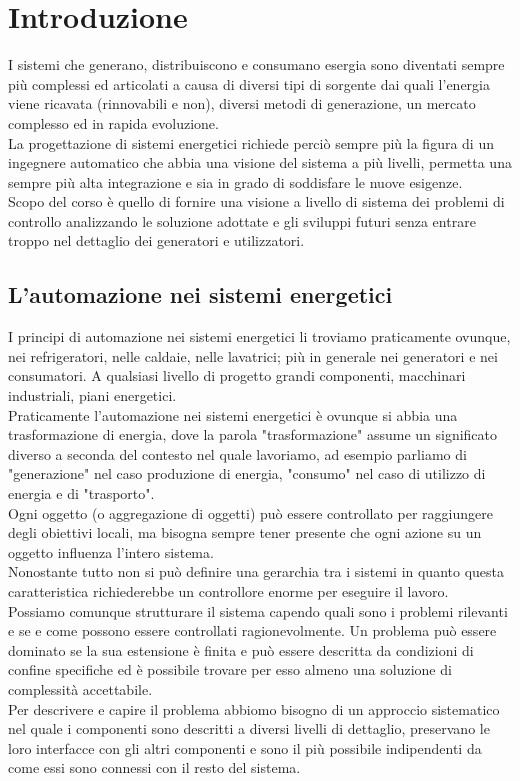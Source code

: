 ﻿\label{capitolo1}
\section{Introduzione}I sistemi che generano, distribuiscono e consumano esergia sono diventati sempre più complessi ed articolati a causa di diversi tipi di sorgente dai quali l'energia viene ricavata (rinnovabili e non), diversi metodi di generazione, un mercato complesso ed in rapida evoluzione.\\
La progettazione di sistemi energetici richiede perciò sempre più la figura di un ingegnere automatico che abbia una visione del sistema a più livelli, permetta una sempre più alta integrazione e sia in grado di soddisfare le nuove esigenze.\\
Scopo del corso è quello di fornire una visione a livello di sistema dei problemi di controllo analizzando le soluzione adottate e gli sviluppi futuri senza entrare troppo nel dettaglio dei generatori e utilizzatori.
\subsection{L'automazione nei sistemi energetici}
I principi di automazione nei sistemi energetici li troviamo praticamente ovunque, nei refrigeratori, nelle caldaie, nelle lavatrici; più in generale nei generatori e nei consumatori.
A qualsiasi livello di progetto grandi componenti, macchinari industriali, piani energetici.\\
Praticamente l'automazione nei sistemi energetici è ovunque si abbia una trasformazione di energia, dove la parola "trasformazione" assume un significato diverso a seconda del contesto nel quale lavoriamo, ad esempio parliamo di "generazione" nel caso produzione di energia, "consumo" nel caso di utilizzo di energia e di "trasporto".\\
Ogni oggetto (o aggregazione di oggetti) può essere controllato per raggiungere degli obiettivi locali, ma bisogna sempre tener presente che ogni azione su un oggetto influenza l'intero sistema.\\
Nonostante tutto non si può definire una gerarchia tra i sistemi in quanto questa caratteristica richiederebbe un controllore enorme per eseguire il lavoro.\\
Possiamo comunque strutturare il sistema capendo quali sono i problemi rilevanti e se e come possono essere controllati ragionevolmente.
Un problema può essere dominato se la sua estensione è finita e può essere descritta da condizioni di confine specifiche ed è possibile trovare per esso almeno una soluzione di complessità accettabile.\\
Per descrivere e capire il problema abbiomo bisogno di un approccio sistematico nel quale i componenti sono descritti a diversi livelli di dettaglio, preservano le loro interfacce con gli altri componenti e sono il più possibile indipendenti da come essi sono connessi con il resto del sistema.
